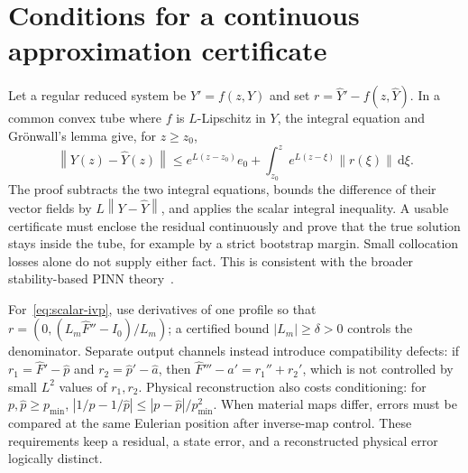 \documentclass[12pt,a4paper,oneside]{report}
\numberwithin{equation}{chapter}
\theoremstyle{remark}\newtheorem{remark}[theorem]{Remark}
\newcommand{\dd}{\,\mathrm d}
\newcommand{\norm}[1]{\left\lVert#1\right\rVert}
\begin{document}
\section{Conditions for a continuous approximation certificate}\label{sec:error}
Let a regular reduced system be $Y'=f(z,Y)$ and set
$r=\widehat Y'-f(z,\widehat Y)$. In a common convex tube where $f$ is
$L$-Lipschitz in $Y$, the integral equation and Gr\"onwall's lemma
\cite[Lemma~2.7]{teschl2012} give, for $z\ge z_0$,
\begin{equation}\label{eq:gronwall}
 \norm{Y(z)-\widehat Y(z)}\le e^{L(z-z_0)}e_0+
 \int_{z_0}^{z}e^{L(z-\xi)}\norm{r(\xi)}\dd\xi.
\end{equation}
The proof subtracts the two integral equations, bounds the difference of
their vector fields by $L\norm{Y-\widehat Y}$, and applies the scalar
integral inequality. A usable certificate must enclose the residual
continuously and prove that the true solution stays inside the tube, for
example by a strict bootstrap margin. Small collocation losses alone do not
supply either fact. This is consistent with the broader stability-based
PINN theory~\cite{mishra2023}.

For~\eqref{eq:scalar-ivp}, use derivatives of one profile so that
$r=(0,(L_m\widehat F''-I_0)/L_m)$; a certified bound $|L_m|\ge\delta>0$
controls the denominator. Separate output channels instead introduce
compatibility defects: if $r_1=\widehat F'-\widehat p$ and
$r_2=\widehat p'-\widehat a$, then
$\widehat F'''-\widehat a'=r_1''+r_2'$, which is not controlled by small
$L^2$ values of $r_1,r_2$.
Physical reconstruction also costs conditioning: for $p,\widehat p\ge p_{\min}$,
$|1/p-1/\widehat p|\le|p-\widehat p|/p_{\min}^2$.
When material maps differ, errors must be compared at the same Eulerian
position after inverse-map control. These requirements keep a residual,
a state error, and a reconstructed physical error logically distinct.
\end{document}
